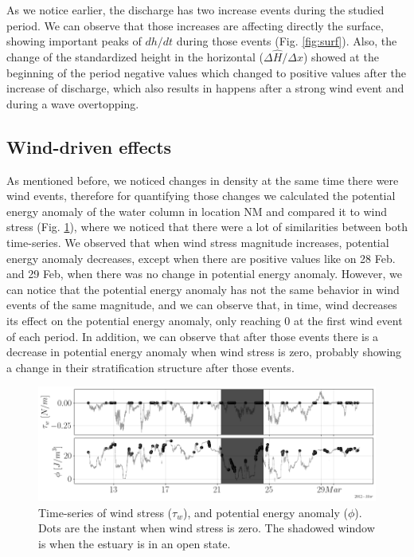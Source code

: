 \documentclass[tesis.tex]{subfiles}
\begin{document}
As we notice earlier, the discharge has two increase events during the studied period. We can observe that those increases are affecting directly the surface, showing important peaks of $dh/dt$ during those events (Fig. \ref{fig:surf}). Also, the change of the standardized height in the horizontal ($\Delta \hat{H}/\Delta x$) showed at the beginning of the period negative values which changed to positive values after the increase of discharge, which also results in happens after a strong wind event and during a wave overtopping.\\

\subsection{Wind-driven effects}

As mentioned before, we noticed changes in density at the same time there were wind events, therefore for quantifying those changes we calculated the potential energy anomaly of the water column in location NM and compared it to wind stress (Fig. \ref{fig:phi}), where we noticed that there were a lot of similarities between both time-series. We observed that when wind stress magnitude increases, potential energy anomaly decreases, except when there are positive values like on 28 Feb. and 29 Feb, when there was no change in potential energy anomaly. However, we can notice that the potential energy anomaly has not the same behavior in wind events of the same magnitude, and we can observe that, in time, wind decreases its effect on the potential energy anomaly, only reaching 0 at the first wind event of each period. In addition, we can observe that after those events there is a decrease in potential energy anomaly when wind stress is zero, probably showing a change in their stratification structure after those events.\\

\begin{figure}[h!]
    \centering
    \includegraphics[width=\textwidth]{Imagenes/phi.png}
    \caption{Time-series of wind stress ($\tau_w$), and potential energy anomaly ($\phi$). Dots are the instant when wind stress is zero. The shadowed window is when the estuary is in an open state.}
    \label{fig:phi}
\end{figure}
\end{document}
